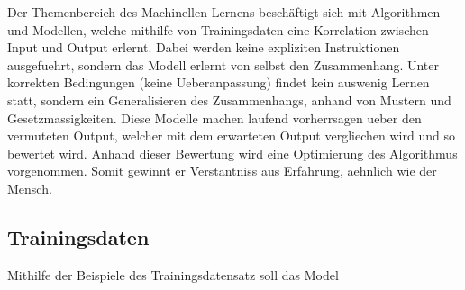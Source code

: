 \documentclass[../main]{subfiles}
\begin{document}
Der Themenbereich des Machinellen Lernens beschäftigt sich mit Algorithmen und Modellen, welche mithilfe von Trainingsdaten eine Korrelation zwischen Input und Output erlernt. Dabei werden keine expliziten Instruktionen ausgefuehrt, sondern das Modell erlernt von selbst den Zusammenhang. Unter korrekten Bedingungen (keine Ueberanpassung) findet kein auswenig Lernen statt, sondern ein Generalisieren des Zusammenhangs, anhand von Mustern und Gesetzmassigkeiten.
Diese Modelle machen laufend vorherrsagen ueber den vermuteten Output, welcher mit dem erwarteten Output vergliechen wird und so bewertet wird. Anhand dieser Bewertung wird eine Optimierung des Algorithmus vorgenommen. Somit gewinnt er Verstantniss aus Erfahrung, aehnlich wie der Mensch. 

\subsection{Trainingsdaten}
Mithilfe der Beispiele des Trainingsdatensatz soll das Model
\end{document}
